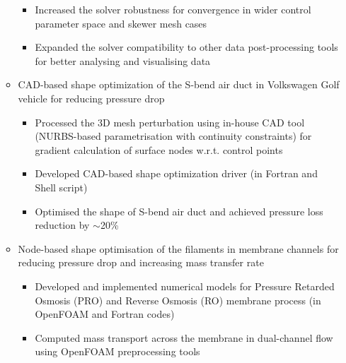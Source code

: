 \documentclass[letterpaper]{article}
\begin{document}
\begin{itemize}
\begin{itemize}
\begin{itemize}
		\item Increased the solver robustness for convergence in wider control parameter space and skewer mesh cases
		\item Expanded the solver compatibility to other data post-processing tools for better analysing and visualising data
		\end{itemize}
		\item CAD-based shape optimization of the S-bend air duct in Volkswagen Golf vehicle for reducing pressure drop
		\begin{itemize}
		\item Processed the 3D mesh perturbation using in-house CAD tool (NURBS-based parametrisation with continuity constraints) for gradient calculation of surface nodes w.r.t. control points
		\item	Developed CAD-based shape optimization driver (in Fortran and Shell script)
		\item Optimised the shape of S-bend air duct and achieved pressure loss reduction by $\sim$20\%%
		\end{itemize}
		
		
		\item	Node-based shape optimisation of the filaments in membrane channels for reducing pressure drop and increasing mass transfer rate
					\begin{itemize}
					\item Developed and implemented numerical models for Pressure Retarded Osmosis (PRO) and Reverse Osmosis (RO) membrane process (in OpenFOAM and Fortran codes)
					\item Computed mass transport across the membrane in dual-channel flow using OpenFOAM preprocessing tools
					

\end{itemize}
\end{itemize}
\end{itemize}
\end{document}
